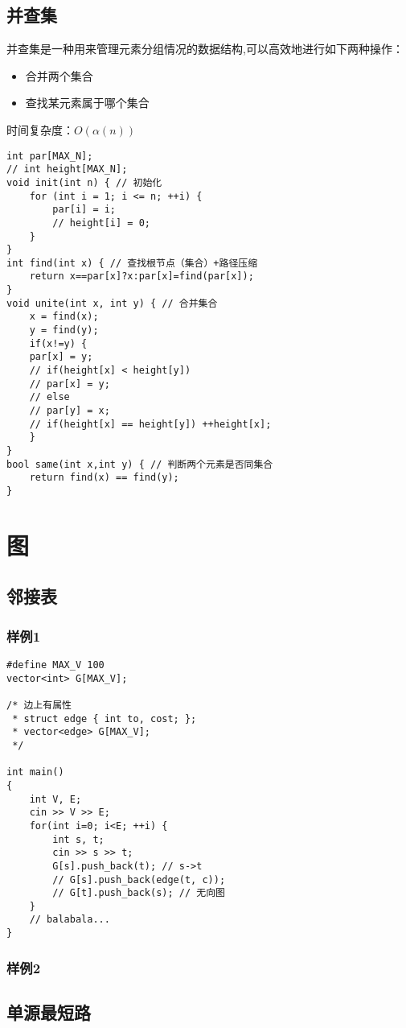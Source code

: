 \documentclass[a4paper]{ctexrep}
\begin{document}
\section{并查集}
并查集是一种用来管理元素分组情况的数据结构,可以高效地进行如下两种操作：
\begin{itemize}
		\item 合并两个集合
		\item 查找某元素属于哪个集合
\end{itemize}

时间复杂度：\(O(\alpha(n))\)
\begin{lstlisting}
int par[MAX_N];
// int height[MAX_N];
void init(int n) { // 初始化
	for (int i = 1; i <= n; ++i) {
		par[i] = i;
		// height[i] = 0;
	}
}
int find(int x) { // 查找根节点（集合）+路径压缩
	return x==par[x]?x:par[x]=find(par[x]);
}
void unite(int x, int y) { // 合并集合
	x = find(x);
	y = find(y);
	if(x!=y) {
	par[x] = y;
	// if(height[x] < height[y])
	// par[x] = y;
	// else
	// par[y] = x;
	// if(height[x] == height[y]) ++height[x];
	}
}
bool same(int x,int y) { // 判断两个元素是否同集合
	return find(x) == find(y);
}
\end{lstlisting}


\chapter{图}
\section{邻接表}
\subsection{样例1}
\begin{lstlisting}
#define MAX_V 100
vector<int> G[MAX_V];

/* 边上有属性
 * struct edge { int to, cost; };
 * vector<edge> G[MAX_V];
 */

int main()
{
	int V, E;
	cin >> V >> E;
	for(int i=0; i<E; ++i) {
		int s, t;
		cin >> s >> t;
		G[s].push_back(t); // s->t
		// G[s].push_back(edge(t, c));
		// G[t].push_back(s); // 无向图
	}
	// balabala...
}
\end{lstlisting}


\subsection{样例2}
\section{单源最短路}
\end{document}
